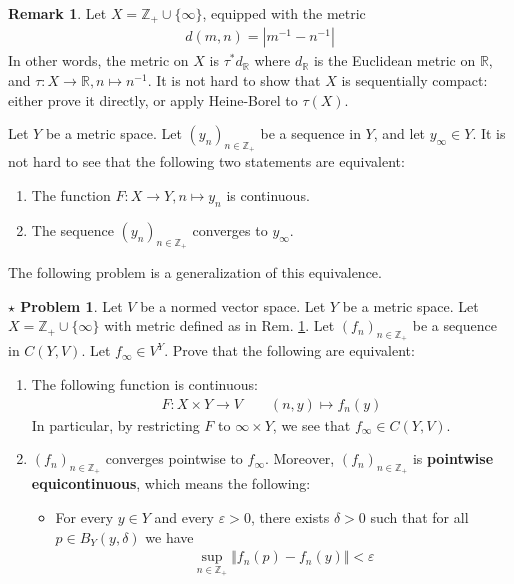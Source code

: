 \documentclass[12pt,b5paper,notitlepage]{article}
\theoremstyle{definition}
\newtheorem{rem}[df]{Remark}
\newtheorem{sprob}[prob]{\color{red}$\star$ Problem}
\theoremstyle{plain}
\newcommand{\Zbb}{\mathbb Z}
\newcommand{\Rbb}{\mathbb R}
\newcommand{\eps}{\varepsilon}
\numberwithin{equation}{section}
\begin{document}
\begin{rem}\label{lb102}
Let $X=\Zbb_+\cup\{\infty\}$, equipped with the metric
\begin{align*}
d(m,n)=|m^{-1}-n^{-1}|
\end{align*} 
In other words, the metric on $X$ is $\tau^*d_\Rbb$ where $d_\Rbb$ is the Euclidean metric on $\Rbb$, and $\tau:X\rightarrow \Rbb,n\mapsto n^{-1}$. It is not hard to show that $X$ is sequentially compact: either prove it directly, or apply Heine-Borel to $\tau(X)$.

Let $Y$ be a metric space. Let $(y_n)_{n\in\Zbb_+}$ be a sequence in $Y$, and let $y_\infty\in Y$. It is not hard to see that the following two statements are equivalent:
\begin{enumerate}[label=(\arabic*)]
\item The function $F:X\rightarrow Y,n\mapsto y_n$ is continuous.
\item The sequence $(y_n)_{n\in\Zbb_+}$ converges to $y_\infty$.
\end{enumerate}
The following problem is a generalization of this equivalence.  \hfill\qedsymbol
\end{rem}



\begin{sprob}\label{lb104}
Let $V$ be a normed vector space. Let $Y$ be a metric space. Let $X=\Zbb_+\cup\{\infty\}$ with metric defined as in Rem. \ref{lb102}. Let $(f_n)_{n\in\Zbb_+}$ be a sequence in $C(Y,V)$. Let $f_\infty\in V^Y$. Prove that the following are equivalent:
\begin{enumerate}[label=(\arabic*)]
\item The following function is continuous:
\begin{align}
F:X\times Y\rightarrow V\qquad (n,y)\mapsto f_n(y)
\end{align}
In particular, by restricting $F$ to $\infty\times Y$, we see that $f_\infty\in C(Y,V)$.
\item $(f_n)_{n\in\Zbb_+}$ converges pointwise to $f_\infty$. Moreover, $(f_n)_{n\in\Zbb_+}$ is \textbf{pointwise equicontinuous},  which means the following:
\begin{itemize}
\item For every $y\in Y$ and every $\eps>0$, there exists $\delta>0$ such that for all $p\in B_Y(y,\delta)$ we have
\begin{align*}
\sup_{n\in\Zbb_+}\Vert f_n(p)-f_n(y)\Vert<\eps
\end{align*}
\end{itemize}
\end{enumerate}
\end{sprob}
\end{document}
